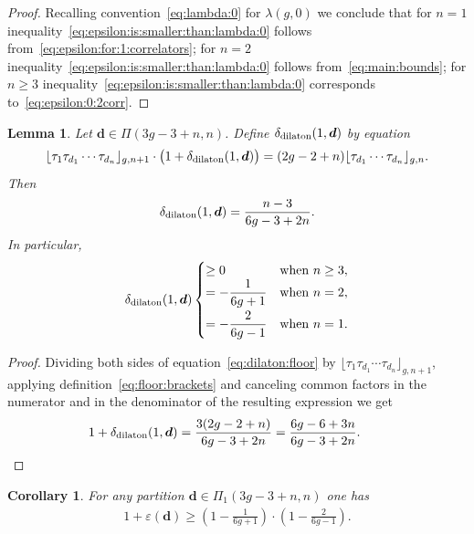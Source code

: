 \documentclass[pdftex]{sigma}
\renewcommand{\epsilon}{\varepsilon}
\newtheorem{Lemma}[Theorem]{Lemma}
\newtheorem{Corollary}[Theorem]{Corollary}
\theoremstyle{definition}
\begin{document}
\begin{proof}Recalling convention~\eqref{eq:lambda:0} for $\lambda(g,0)$ we conclude that
for $n=1$ inequality~\eqref{eq:epsilon:is:smaller:than:lambda:0}
follows from~\eqref{eq:epsilon:for:1:correlators};
for $n=2$ inequality~\eqref{eq:epsilon:is:smaller:than:lambda:0}
follows from~\eqref{eq:main:bounds};
for $n\ge 3$ inequality~\eqref{eq:epsilon:is:smaller:than:lambda:0}
corresponds to~\eqref{eq:epsilon:0:2corr}.
\end{proof}

\begin{Lemma}\label{lm:dilaton}
Let $\boldsymbol{d}\in\Pi(3g-3+n,n)$.
Define $\delta_{\rm dilaton}(1,\boldsymbol{d})$
by equation
\begin{gather}\label{eq:dilaton:floor}
\lfloor \tau_1\tau_{d_1} \cdots \tau_{d_n}\rfloor_{g,n+1}
\cdot\big(1+\delta_{\rm dilaton}(1,\boldsymbol{d})\big)
=(2g-2+n)
\lfloor \tau_{d_1} \cdots \tau_{d_n}\rfloor_{g,n} .
\end{gather}
Then
\[
\delta_{\rm dilaton}(1,\boldsymbol{d})
=\frac{n-3}{6g-3+2n} .
\]
In particular,
\begin{gather}\label{eq:delta:dilaton}
\delta_{\rm dilaton}(1,\boldsymbol{d})
\begin{cases}
\ge 0&\text{when }n\ge 3 ,
\\
= -\dfrac{1}{6g+1}
&\text{when }n=2 ,
\vspace{1mm}\\
= -\dfrac{2}{6g-1}
&\text{when }n=1 .
\end{cases}
\end{gather}
\end{Lemma}

\begin{proof}Dividing both sides of equation~\eqref{eq:dilaton:floor} by
$\lfloor \tau_1\tau_{d_1} \cdots \tau_{d_n}\rfloor_{g,n+1}$,
applying definition~\eqref{eq:floor:brackets}
and canceling common factors in the numerator and in the denominator
of the resulting expression we get
\[
1+\delta_{\rm dilaton}(1,\boldsymbol{d})
=\frac{3(2g-2+n)}{6g-3+2n}
=\frac{6g-6+3n}{6g-3+2n} .\tag*{\qed}
\]\renewcommand{\qed}{}
\end{proof}

\begin{Corollary}\label{cor:epsilon:L:1}
For any partition
$\boldsymbol{d}\in\Pi_1(3g-3+n,n)$ one has
\begin{gather}\label{eq:epsilon:L:1}
1+\epsilon(\boldsymbol{d})\ge
\left(1-\frac{1}{6g+1}\right)
\cdot\left(1-\frac{2}{6g-1}\right) .
\end{gather}
\end{Corollary}
\end{document}
